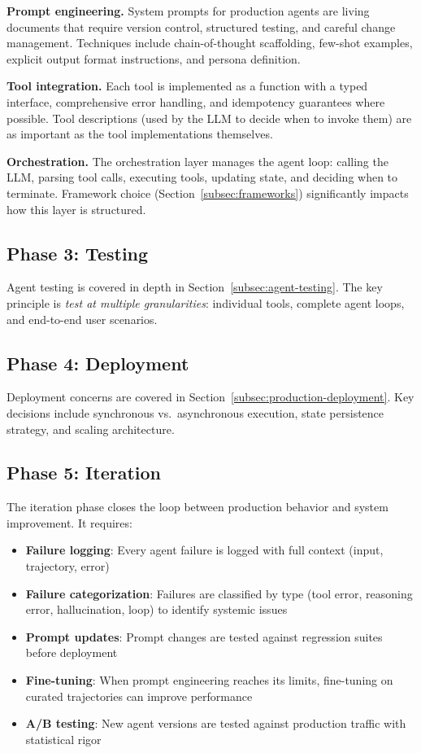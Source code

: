 \textbf{Prompt engineering.} System prompts for production agents are living documents that require version control, structured testing, and careful change management. Techniques include chain-of-thought scaffolding, few-shot examples, explicit output format instructions, and persona definition.

\textbf{Tool integration.} Each tool is implemented as a function with a typed interface, comprehensive error handling, and idempotency guarantees where possible. Tool descriptions (used by the LLM to decide when to invoke them) are as important as the tool implementations themselves.

\textbf{Orchestration.} The orchestration layer manages the agent loop: calling the LLM, parsing tool calls, executing tools, updating state, and deciding when to terminate. Framework choice (Section~\ref{subsec:frameworks}) significantly impacts how this layer is structured.

\subsection{Phase 3: Testing}
\label{phase-3-testing}

Agent testing is covered in depth in Section~\ref{subsec:agent-testing}. The key principle is \emph{test at multiple granularities}: individual tools, complete agent loops, and end-to-end user scenarios.

\subsection{Phase 4: Deployment}
\label{phase-4-deployment}

Deployment concerns are covered in Section~\ref{subsec:production-deployment}. Key decisions include synchronous vs.~asynchronous execution, state persistence strategy, and scaling architecture.

\subsection{Phase 5: Iteration}
\label{phase-5-iteration}

The iteration phase closes the loop between production behavior and system improvement. It requires:

\begin{itemize}
  \item \textbf{Failure logging}: Every agent failure is logged with full context (input, trajectory, error)
  \item \textbf{Failure categorization}: Failures are classified by type (tool error, reasoning error, hallucination, loop) to identify systemic issues
  \item \textbf{Prompt updates}: Prompt changes are tested against regression suites before deployment
  \item \textbf{Fine-tuning}: When prompt engineering reaches its limits, fine-tuning on curated trajectories can improve performance
  \item \textbf{A/B testing}: New agent versions are tested against production traffic with statistical rigor
\end{itemize}

